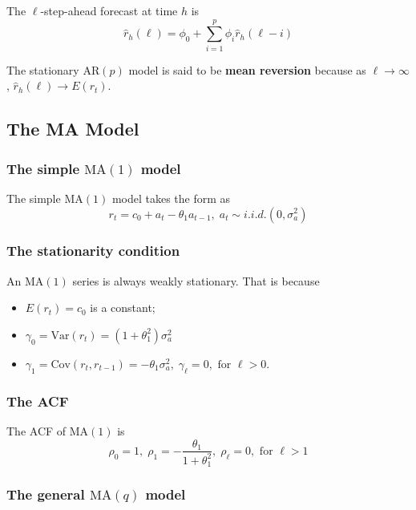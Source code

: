 \documentclass[a4paper,11pt]{article}
\newcommand{\var}{\mathrm{Var}}
\newcommand{\cov}{\mathrm{Cov}}
\begin{document}
The \(\ell\)-step-ahead forecast at time \(h\) is
\[ \hat{r}_h(\ell) = \phi_0 + \sum_{i=1}^p \phi_i \hat{r}_h(\ell-i) \]

The stationary \(\mathrm{AR}(p)\) model is said to be \textbf{mean reversion}
because as \(\ell \rightarrow \infty\), \(\hat{r}_h(\ell) \rightarrow
E(r_t)\).


\subsection{The MA Model}
\label{sec:orgc03f1be}

\subsubsection*{The simple \(\mathrm{MA}(1)\) model}
\label{sec:org9477336}

The simple \(\mathrm{MA}(1)\) model takes the form as
\begin{equation}
\label{eq-ma1}
r_t = c_0 + a_t - \theta_1 a_{t-1},\; a_t \sim i.i.d.(0, \sigma^2_a)
\end{equation}

\subsubsection*{The stationarity condition}
\label{sec:org4259738}

An \(\mathrm{MA}(1)\) series is always weakly stationary. That is because
\begin{itemize}
\item \(E(r_t) = c_0\) is a constant;
\item \(\gamma_0 = \var(r_t) = (1 + \theta_1^2) \sigma^2_a\)
\item \(\gamma_1 = \cov(r_t, r_{t-1}) = -\theta_1 \sigma^2_a,\;
  \gamma_{\ell} = 0, \text{ for } \ell>0\).
\end{itemize}

\subsubsection*{The ACF}
\label{sec:orgb4b70e8}

The ACF of \(\mathrm{MA}(1)\) is
\[\rho_0 = 1,\; \rho_1 = -\frac{\theta_1}{1+\theta^2_1},\; \rho_{\ell}
= 0, \text{ for } \ell>1 \]

\subsubsection*{The general \(\mathrm{MA}(q)\) model}
\label{sec:orgaa8b20a}
\end{document}
